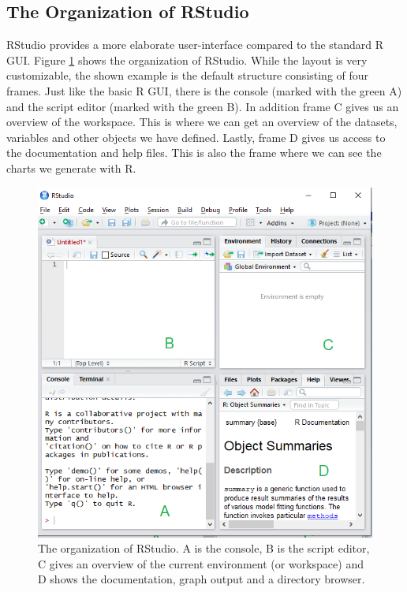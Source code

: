 \documentclass[]{book}
\begin{document}
\hypertarget{the-organization-of-rstudio}{%
\subsection{The Organization of RStudio}\label{the-organization-of-rstudio}}

RStudio provides a more elaborate user-interface compared to the standard R GUI. Figure \ref{fig:rguide2} shows the organization of RStudio. While the layout is very customizable, the shown example is the default structure consisting of four frames. Just like the basic R GUI, there is the console (marked with the green A) and the script editor (marked with the green B). In addition frame C gives us an overview of the workspace. This is where we can get an overview of the datasets, variables and other objects we have defined. Lastly, frame D gives us access to the documentation and help files. This is also the frame where we can see the charts we generate with R.

\begin{figure}

{\centering \includegraphics[width=0.9\linewidth]{_resources/chapter_Rbasic/rstudio} 

}

\caption{The organization of RStudio.  A is the console, B is the script editor, C gives an overview of the current environment (or workspace) and D shows the documentation, graph output and a directory browser. }\label{fig:rguide2}
\end{figure}
\end{document}
